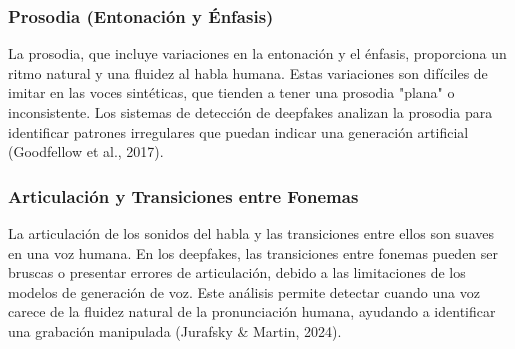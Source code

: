 \subsubsection{Prosodia (Entonación y Énfasis)}
La prosodia, que incluye variaciones en la entonación y el énfasis, proporciona un ritmo natural y una fluidez al habla humana. Estas variaciones son difíciles de imitar en las voces sintéticas, que tienden a tener una prosodia "plana" o inconsistente. Los sistemas de detección de deepfakes analizan la prosodia para identificar patrones irregulares que puedan indicar una generación artificial (Goodfellow et al., 2017).

\subsubsection{Articulación y Transiciones entre Fonemas}
La articulación de los sonidos del habla y las transiciones entre ellos son suaves en una voz humana. En los deepfakes, las transiciones entre fonemas pueden ser bruscas o presentar errores de articulación, debido a las limitaciones de los modelos de generación de voz. Este análisis permite detectar cuando una voz carece de la fluidez natural de la pronunciación humana, ayudando a identificar una grabación manipulada (Jurafsky \& Martin, 2024).
